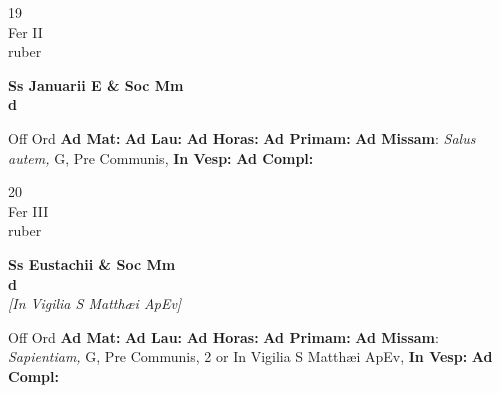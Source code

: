 \documentclass[10pt, openany]{book}
\begin{document}
    \begin{center}
        \begin{minipage}{3.5in}
            \vspace{2em}
            \begin{minipage}{0.5in}
                {\Huge 19} \\
                {\normalsize Fer II} \\
                {\normalsize ruber}
            \end{minipage}
            \begin{minipage}{3.0in}
                \textbf{ \large Ss Januarii E \& Soc Mm \\
                \textnormal{\normalsize d}} \\ 
            \end{minipage}
            \begin{justify}Off Ord
                \textbf{Ad Mat: }
                \textbf{Ad Lau: }
                \textbf{Ad Horas: }
                \textbf{Ad Primam: }\textbf{Ad Missam}: \textit{Salus autem,} G, Pre Communis,  
                \textbf{In Vesp: }
                \textbf{Ad Compl: }
            \end{justify}
        \end{minipage}
    \end{center}

    \begin{center}
        \begin{minipage}{3.5in}
            \vspace{2em}
            \begin{minipage}{0.5in}
                {\Huge 20} \\
                {\normalsize Fer III} \\
                {\normalsize ruber}
            \end{minipage}
            \begin{minipage}{3.0in}
                \textbf{ \large Ss Eustachii \& Soc Mm \\
                \textnormal{\normalsize d}} \\ \textit{[In Vigilia S Matthæi ApEv]} \\ 
            \end{minipage}
            \begin{justify}Off Ord
                \textbf{Ad Mat: }
                \textbf{Ad Lau: }
                \textbf{Ad Horas: }
                \textbf{Ad Primam: }\textbf{Ad Missam}: \textit{Sapientiam,} G, Pre Communis, 2 or In Vigilia S Matthæi ApEv,  
                \textbf{In Vesp: }
                \textbf{Ad Compl: }
            \end{justify}
        \end{minipage}
    \end{center}
\end{document}
